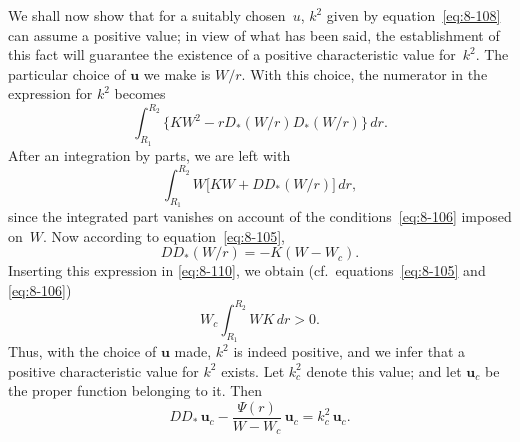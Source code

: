 We shall now show that for a suitably chosen~$u$, $k^2$ given by equation~\eqref{eq:8-108} can assume a positive value; in view of what has been said, the establishment of this fact will guarantee the existence of a positive characteristic value for~$k^2$. The particular choice of $\mathbf{u}$ we make is $W/r$. With this choice, the numerator in the expression for $k^2$ becomes
\begin{equation}
\label{eq:8-109}
\int_{R_1}^{R_2}\bigl\{KW^2 - rD_*(W/r)D_*(W/r)\bigr\}\,dr.
\end{equation}
After an integration by parts, we are left with
\begin{equation}
\label{eq:8-110}
\int_{R_1}^{R_2} W\bigl[KW + DD_*(W/r)\bigr]\,dr,
\end{equation}
since the integrated part vanishes on account of the conditions~\eqref{eq:8-106} imposed on~$W$. Now according to equation~\eqref{eq:8-105},
\begin{equation}
\label{eq:8-111}
DD_*(W/r) = -K(W - W_c).
\end{equation}
Inserting this expression in \eqref{eq:8-110}, we obtain (cf.\ equations~\eqref{eq:8-105} and \eqref{eq:8-106})
\begin{equation}
\label{eq:8-112}
W_c\int_{R_1}^{R_2} WK\,dr > 0.
\end{equation}
Thus, with the choice of $\mathbf{u}$ made, $k^2$ is indeed positive, and we infer that a positive characteristic value for $k^2$ exists. Let $k_c^2$ denote this value; and let $\mathbf{u}_c$ be the proper function belonging to it. Then
\begin{equation}
\label{eq:8-113}
DD_*\,\mathbf{u}_c - \frac{\Psi(r)}{W - W_c}\,\mathbf{u}_c = k_c^2\,\mathbf{u}_c.
\end{equation}

